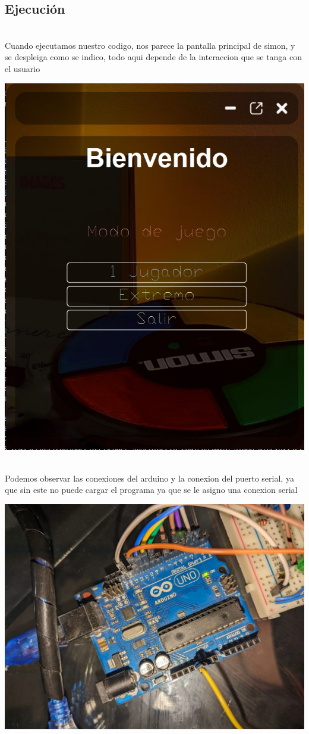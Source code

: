 \documentclass{article}
\begin{document}
{{\newpage
\subsection*{\huge Ejecución}

{\Large\\ Cuando ejecutamos nuestro codigo, nos parece la pantalla principal de simon, y se despleiga como se indico, todo aqui depende de la interaccion que se tanga con el usuario

}

\vspace{0.2cm}
\includegraphics[width=0.5\linewidth]{cbdf35fc-d1bb-4aa4-8690-dcb82a1c29b8.jpg}
{\Large \\Podemos observar las conexiones del arduino y la conexion del puerto serial, ya que sin este no puede cargar el programa ya que se le asigno una conexion serial

}


\vspace{0.2cm}


\includegraphics[width=0.5\linewidth]{f7e61b87-70d0-4296-bf4a-1963941b228b.jpg}

\vspace{0.2cm}




}}
\end{document}
